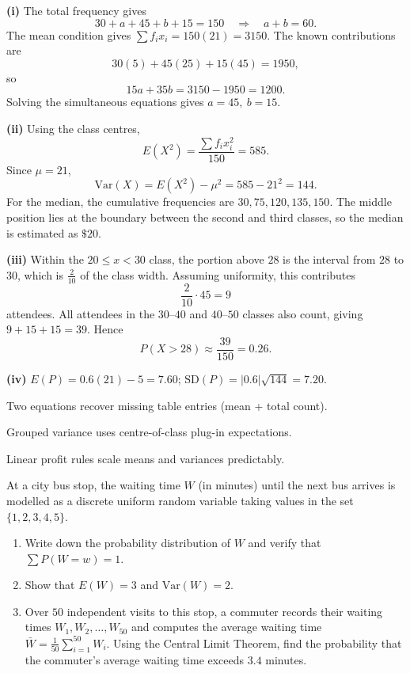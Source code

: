 \begin{solution}
\textbf{(i)} The total frequency gives
\[
30+a+45+b+15=150\quad\Rightarrow\quad a+b=60.
\]
The mean condition gives $\sum f_ix_i=150(21)=3150$. The known contributions are
\[
30(5)+45(25)+15(45)=1950,
\]
so
\[
15a+35b=3150-1950=1200.
\]
Solving the simultaneous equations gives $\boxed{a=45,\ b=15}$.

\textbf{(ii)} Using the class centres,
\[
E(X^2)=\frac{\sum f_ix_i^2}{150}=585.
\]
Since $\mu=21$,
\[
\mathrm{Var}(X)=E(X^2)-\mu^2=585-21^2=\boxed{144}.
\]
For the median, the cumulative frequencies are $30,75,120,135,150$. The middle position lies at the boundary between the second and third classes, so the median is estimated as $\boxed{\$20}$.

\textbf{(iii)} Within the $20\le x<30$ class, the portion above $28$ is the interval from $28$ to $30$, which is $\frac{2}{10}$ of the class width. Assuming uniformity, this contributes
\[
\frac{2}{10}\cdot45=9
\]
attendees. All attendees in the $30$--$40$ and $40$--$50$ classes also count, giving $9+15+15=39$. Hence
\[
P(X>28)\approx\frac{39}{150}=\boxed{0{.}26}.
\]

\textbf{(iv)} $E(P)=0{.}6(21)-5=7{.}60$; $\mathrm{SD}(P)=|0{.}6|\sqrt{144}=7{.}20$.
\end{solution}

\begin{takeaways}
\item Two equations recover missing table entries (mean + total count).
\item Grouped variance uses centre-of-class plug-in expectations.
\item Linear profit rules scale means and variances predictably.
\end{takeaways}

\begin{problem}
At a city bus stop, the waiting time $W$ (in minutes) until the next bus arrives is modelled as a discrete uniform random variable taking values in the set $\{1, 2, 3, 4, 5\}$.
\begin{enumerate}[label=\textbf{(\roman*)}]
  \item Write down the probability distribution of $W$ and verify that $\sum P(W=w) = 1$.
  \item Show that $E(W) = 3$ and $\mathrm{Var}(W) = 2$.
  \item Over $50$ independent visits to this stop, a commuter records their waiting times $W_1, W_2, \ldots, W_{50}$ and computes the average waiting time $\bar{W} = \frac{1}{50}\sum_{i=1}^{50} W_i$. Using the Central Limit Theorem, find the probability that the commuter's average waiting time exceeds $3.4$ minutes.
\end{enumerate}
\end{problem}

